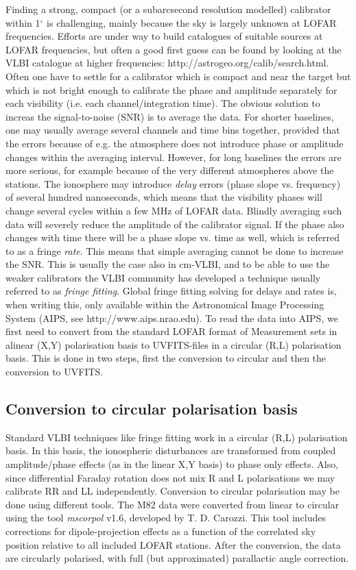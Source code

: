 Finding a strong, compact (or a subarcsecond resolution modelled) calibrator within
1$^\circ$ is challenging, mainly because the sky is largely unknown at LOFAR
frequencies. Efforts are under way to build catalogues of suitable sources at
LOFAR frequencies, but often a good first guess can be found by looking at the
VLBI catalogue at higher frequencies: http://astrogeo.org/calib/search.html.
Often one have to settle for a calibrator which is compact and near the target
but which is not bright enough to calibrate the phase and amplitude separately
for each visibility (i.e. each channel/integration time).  The obvious solution
to increas the signal-to-noise (SNR) is to average the data. For shorter
baselines, one may usually average several channels and time bins together,
provided that the errors because of e.g. the atmosphere does not introduce
phase or amplitude changes within the averaging interval. However, for long
baselines the errors are more serious, for example because of the very
different atmospheres above the stations. The ionosphere may introduce
\emph{delay} errors (phase slope vs. frequency) of several hundred nanoseconds,
which means that the visibility phases will change several cycles within a few
MHz of LOFAR data. Blindly averaging such data will severely reduce the
amplitude of the calibrator signal. If the phase also changes with time there
will be a phase slope vs. time as well, which is referred to as a fringe
\emph{rate}.  This means that simple averaging cannot be done to increase the
SNR. This is usually the case also in cm-VLBI, and to be able to use the weaker
calibrators the VLBI community has developed a technique usually referred to as
\emph{fringe fitting}. 
Global fringe fitting solving for delays and rates is, when writing this,
only available within the Astronomical Image Processing System (AIPS,
see http://www.aips.nrao.edu). To read the data into AIPS, we first need
to convert from the standard LOFAR format of Measurement sets in alinear (X,Y)
polarisation basis to UVFITS-files in a circular (R,L) polarisation basis. 
This is done in two steps, first the conversion to circular and then the conversion
to UVFITS.

\subsection{Conversion to circular polarisation basis}
Standard VLBI techniques like fringe fitting work in a circular (R,L)
polarisation basis. In this basis, the ionospheric disturbances are transformed
from coupled amplitude/phase effects (as in the linear X,Y basis) to phase only 
effects. Also, since differential Faraday rotation does not mix R and L
polarisations we may calibrate RR and LL independently. Conversion to 
circular polarisation may be done using different tools. 
The M82 data \cite{varenius2014} were converted from linear to circular
using the tool \emph{mscorpol} v1.6, developed by T. D. Carozzi.
This tool includes corrections for dipole-projection effects as a function of
the correlated sky position relative to all included LOFAR stations.  After the conversion,
the data are circularly polarised, with full (but approximated) parallactic angle
correction. 

